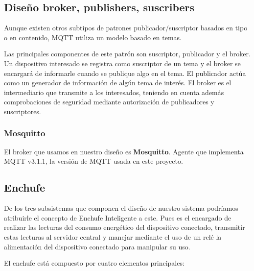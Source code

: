 \documentclass[a4paper,10pt]{article}
\begin{document}
\subsection{Diseño broker, publishers,
suscribers}\label{diseuxf1o-broker-publishers-suscribers}

Aunque existen otros subtipos de patrones publicador/suscriptor
basados en tipo o en contenido\cite{p.th.eugsterManyFacesPublish},
MQTT utiliza un modelo basado en temas.

Las principales componentes de este patrón son suscriptor, publicador
y el broker. Un dispositivo interesado se registra como suscriptor de
un tema y el broker se encargará de informarle cuando se publique algo
en el tema. El publicador actúa como un generador de información de
algún tema de interés. El broker es el intermediario que transmite a
los interesados, teniendo en cuenta además comprobaciones de seguridad
mediante autorización de publicadores y
suscriptores.\cite{al-fuqahaInternetThingsSurvey2015,hunkelerMQTTSPublishSubscribe2008}

\subsubsection{Mosquitto}

El broker que usamos en nuestro diseño es
\textbf{Mosquitto}\cite{EclipseMosquitto}. Agente que implementa MQTT
v3.1.1, la versión de MQTT usada en este proyecto.

\subsection{Enchufe}\label{subsec:enchufe}

De los tres subsistemas que componen el diseño de nuestro sistema
podríamos atribuirle el concepto de Enchufe Inteligente a este. Pues
es el encargado de realizar las lecturas del consumo energético del
dispositivo conectado, transmitir estas lecturas al servidor central y
manejar mediante el uso de un relé la alimentación del dispositivo
conectado para manipular su uso.

El enchufe está compuesto por cuatro elementos principales:
\end{document}
